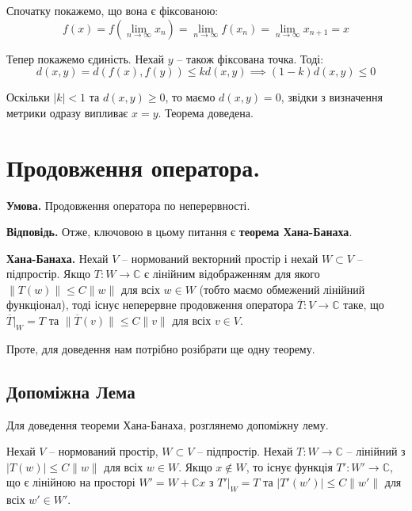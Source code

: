 \documentclass[14pt]{extarticle}
\newcommand{\<}{\langle}
\renewcommand{\>}{\rangle}
\theoremstyle{mystyle}{\newtheorem{definition}{Definition}[section]}
\theoremstyle{mystyle}{\newtheorem{proposition}[definition]{Proposition}}
\theoremstyle{mystyle}{\newtheorem{theorem}[definition]{Theorem}}
\theoremstyle{mystyle}{\newtheorem{lemma}[definition]{Lemma}}
\theoremstyle{mystyle}{\newtheorem{corollary}[definition]{Corollary}}
\theoremstyle{mystyle}{\newtheorem*{remark}{Remark}}
\theoremstyle{mystyle}{\newtheorem*{remarks}{Remarks}}
\theoremstyle{mystyle}{\newtheorem*{example}{Example}}
\theoremstyle{mystyle}{\newtheorem*{examples}{Examples}}
\theoremstyle{definition}{\newtheorem*{exercise}{Exercise}}
\theoremstyle{cstyle}{\newtheorem*{cthm}{}}
\theoremstyle{warn}
\begin{document}
Спочатку покажемо, що вона є фіксованою:
\begin{equation}
    f(x) = f(\lim_{n \to \infty}x_n) = \lim_{n \to \infty}f(x_n) = \lim_{n \to \infty}x_{n+1} = x
\end{equation}

Тепер покажемо єдиність. Нехай $y$ -- також фіксована точка. Тоді:
\begin{equation}
    d(x,y) = d(f(x), f(y)) \leq kd(x,y) \implies (1-k)d(x,y) \leq 0
\end{equation}

Оскільки $|k|<1$ та $d(x,y) \geq 0$, то маємо $d(x,y)=0$, звідки з визначення метрики одразу випливає $x=y$. Теорема доведена.

\section{Продовження оператора.}

\textbf{Умова.} Продовження оператора по неперервності.

\textbf{Відповідь.} Отже, ключовою в цьому питання є \textbf{теорема Хана-Банаха}.

\begin{theorem}
    \textbf{Хана-Банаха.} Нехай $V$ -- нормований векторний простір і нехай $W \subset V$ -- підпростір. Якщо $T: W \to \mathbb{C}$ є лінійним відображенням для якого $\|T(w)\| \leq C\|w\|$ для всіх $w \in W$ (тобто маємо обмежений лінійний функціонал), тоді існує неперервне продовження оператора $\overline{T}: V \to \mathbb{C}$ таке, що $\overline{T}\Big|_{W}=T$ та $\|\overline{T}(v)\| \leq C\|v\|$ для всіх $v \in V$.
\end{theorem}

Проте, для доведення нам потрібно розібрати ще одну теорему.

\subsection{Допоміжна Лема}

Для доведення теореми Хана-Банаха, розглянемо допоміжну лему.

\begin{lemma}
    Нехай $V$ -- нормований простір, $W \subset V$ -- підпростір. Нехай $T: W \to \mathbb{C}$ -- лінійний з $|T(w)| \leq C\|w\|$ для всіх $w \in W$. Якщо $x \notin W$, то існує функція $T': W' \to \mathbb{C}$, що є лінійною на просторі $W'=W+\mathbb{C}x$ з $T'\Big|_{W} = T$ та $|T'(w')| \leq C\|w'\|$ для всіх $w' \in W'$.
\end{lemma}
\end{document}
